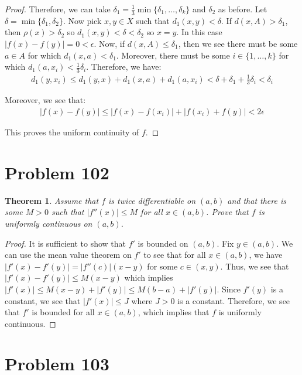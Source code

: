 \documentclass[psamsfonts]{amsart}
\newtheorem{thm}{Theorem}[section]
\theoremstyle{definition}
\theoremstyle{remark}
\numberwithin{equation}{section}
\begin{document}
\begin{proof}
Therefore, we can take $\delta_1 = \frac{1}{3} \min \{ \delta_1, \ldots, \delta_k \}$ and $\delta_2$ as before. Let $\delta = \min \{ \delta_1, \delta_2 \}$. Now pick $x,y \in X$ such that $d_1(x,y) < \delta$. If $d(x,A) > \delta_1$, then $\rho(x) > \delta_2$ so $d_1(x,y) < \delta < \delta_2$ so $x=y$. In this case $|f(x) - f(y)| = 0 < \epsilon$. Now, if $d(x,A) \leq \delta_1$, then we see there must be some $a \in A$ for which $d_1(x,a) < \delta_1$. Moreover, there must be some $i \in \{1,\ldots, k \}$ for which $d_1(a,x_i) < \frac{1}{3} \delta_i$. Therefore, we have:
\begin{eqnarray}
d_1(y, x_i) \leq d_1(y,x) + d_1(x,a) + d_1(a, x_i) < \delta + \delta_1 + \frac{1}{3}\delta_i < \delta_i
\end{eqnarray}

Moreover, we see that:
\begin{eqnarray}
|f(x) - f(y)| \leq |f(x) - f(x_i)| + |f(x_i) + f(y)| < 2 \epsilon
\end{eqnarray}

This proves the uniform continuity of $f$. 
\end{proof}

\section{Problem 102}

\begin{thm}
Assume that $f$ is twice differentiable on $(a,b)$ and that there is some $M > 0$ such that $| f''(x) | \leq M$ for all $x \in (a,b)$. Prove that $f$ is uniformly continuous on $(a,b)$.
\end{thm}

\begin{proof}
It is sufficient to show that $f'$ is bounded on $(a,b)$. Fix $y \in (a,b)$. We can use the mean value theorem on $f'$ to see that for all $x \in (a,b)$, we have $|f'(x) - f'(y)| = |f''(c)| (x-y)$ for some $c \in (x,y)$. Thus, we see that $|f'(x) - f'(y)| \leq M (x - y)$ which implies $|f'(x)| \leq M (x-y) + |f'(y)| \leq M (b-a) + |f'(y)|$. Since $f'(y)$ is a constant, we see that $|f'(x)| \leq J$ where $J > 0$ is a constant. Therefore, we see that $f'$ is bounded for all $x \in (a,b)$, which implies that $f$ is uniformly continuous. 
\end{proof}

\section{Problem 103}
\end{document}
